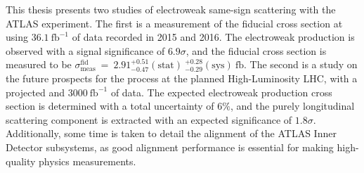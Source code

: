 This thesis presents two studies of electroweak same-sign \ssww scattering with the ATLAS experiment.
The first is a measurement of the fiducial cross section at  using $36.1~\mathrm{fb}^{-1}$ of data recorded in 2015 and 2016.
The electroweak production is observed with a signal significance of $6.9\sigma$, and the fiducial cross section is measured to be $\sigma_{\textrm{meas}}^{\textrm{fid}}~=~2.91^{+0.51}_{-0.47}(\textrm{stat})~^{+0.28}_{-0.29}(\textrm{sys})~\textrm{fb}$.
The second is a study on the future prospects for the \ssww process at the planned High-Luminosity LHC, with a projected  and $3000~\mathrm{fb}^{-1}$ of data.
The expected electroweak production cross section is determined with a total uncertainty  of $6\%$, and the purely longitudinal scattering component is extracted with an expected significance of $1.8\sigma$.
Additionally, some time is taken to detail the alignment of the ATLAS Inner Detector subsystems, as good alignment performance is essential for making high-quality physics measurements.

